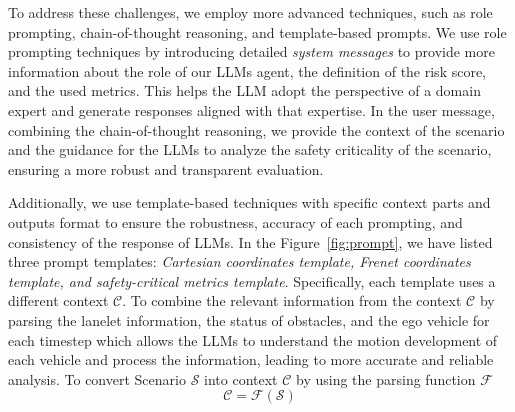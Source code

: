 To address these challenges, we employ more advanced techniques, such as role prompting, chain-of-thought reasoning, and template-based prompts. We use role prompting techniques by introducing detailed \textit{system messages} to provide more information about the role of our LLMs agent, the definition of the risk score, and the used metrics. This helps the LLM adopt the perspective of a domain expert and generate responses aligned with that expertise. In the user message, combining the chain-of-thought reasoning, we provide the context of the scenario and the guidance for the LLMs to analyze the safety criticality of the scenario, ensuring a more robust and transparent evaluation.

Additionally, we use template-based techniques with specific context parts and outputs format to ensure
the robustness, accuracy of each prompting, and consistency
of the response of LLMs. In the Figure~\ref{fig:prompt}, we have listed three prompt templates: \textit{Cartesian coordinates template, Frenet coordinates template, and safety-critical metrics template}. 
Specifically, each template uses a different context $\mathcal{C}$. To combine the relevant information from the context $\mathcal{C}$ by parsing the lanelet information, the status of obstacles, and the ego vehicle for each timestep which allows the LLMs to understand the motion development of each vehicle and process the information, leading to more accurate and reliable analysis.  
To convert Scenario $\mathcal{S}$ into context $\mathcal{C}$ by using the parsing function $\mathcal{F}$
\begin{equation}
    \mathcal{C} = \mathcal{F}(\mathcal{S})
\end{equation}

